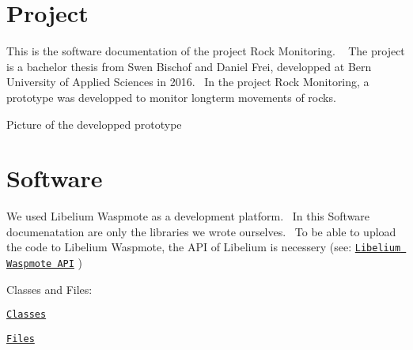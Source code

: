 \hypertarget{index_intro_sec}{}\section{Project}\label{index_intro_sec}
This is the software documentation of the project Rock Monitoring. ~\newline
 The project is a bachelor thesis from Swen Bischof and Daniel Frei, developped at Bern University of Applied Sciences in 2016.~\newline
 In the project Rock Monitoring, a prototype was developped to monitor longterm movements of rocks.

  Picture of the developped prototype \hypertarget{index_soft_sec}{}\section{Software}\label{index_soft_sec}
We used Libelium Waspmote as a development platform.~\newline
 In this Software documenatation are only the libraries we wrote ourselves.~\newline
 To be able to upload the code to Libelium Waspmote, the A\+PI of Libelium is necessery (see\+: \href{https://www.libelium.com/api/waspmote/index.html}{\tt Libelium Waspmote A\+PI} )~\newline


Classes and Files\+: ~\newline
 \begin{DoxyItemize}
\item {\ttfamily } \href{annotated.html}{\tt Classes} \item {\ttfamily } \href{files.html}{\tt Files} \end{DoxyItemize}

